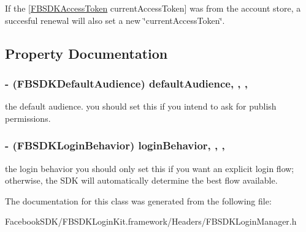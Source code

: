 If the {\ttfamily \mbox{[}\hyperlink{interface_f_b_s_d_k_access_token}{F\-B\-S\-D\-K\-Access\-Token} current\-Access\-Token\mbox{]}} was from the account store, a succesful renewal will also set a new \char`\"{}current\-Access\-Token\char`\"{}. 

\subsection{Property Documentation}
\hypertarget{interface_f_b_s_d_k_login_manager_a4f662c89be174bb577acf75f95aefbc0}{
\subsubsection[{default\-Audience}]{\setlength{\rightskip}{0pt plus 5cm}-\/ (F\-B\-S\-D\-K\-Default\-Audience) default\-Audience\hspace{0.3cm}{\ttfamily [read]}, {\ttfamily [write]}, {\ttfamily [nonatomic]}, {\ttfamily [assign]}}}\label{interface_f_b_s_d_k_login_manager_a4f662c89be174bb577acf75f95aefbc0}
the default audience.  you should set this if you intend to ask for publish permissions. \hypertarget{interface_f_b_s_d_k_login_manager_a6380b50840262848d8fd3e224de9f520}{
\subsubsection[{login\-Behavior}]{\setlength{\rightskip}{0pt plus 5cm}-\/ (F\-B\-S\-D\-K\-Login\-Behavior) login\-Behavior\hspace{0.3cm}{\ttfamily [read]}, {\ttfamily [write]}, {\ttfamily [nonatomic]}, {\ttfamily [assign]}}}\label{interface_f_b_s_d_k_login_manager_a6380b50840262848d8fd3e224de9f520}
the login behavior  you should only set this if you want an explicit login flow; otherwise, the S\-D\-K will automatically determine the best flow available. 

The documentation for this class was generated from the following file\-:\begin{DoxyCompactItemize}
\item 
Facebook\-S\-D\-K/\-F\-B\-S\-D\-K\-Login\-Kit.\-framework/\-Headers/F\-B\-S\-D\-K\-Login\-Manager.\-h\end{DoxyCompactItemize}
